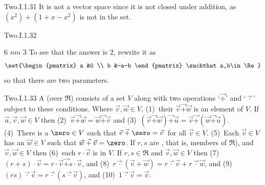 \begin{ans}{Two.I.1.31}
      It is not a vector space since it is not closed under addition, as
      \( (x^2)+(1+x-x^2) \) is not in the set.
    
\end{ans}
\begin{ans}{Two.I.1.32}
      \begin{exparts}
        \partsitem \( 6 \)
        \partsitem \( nm \)
        \partsitem \( 3 \)
        \partsitem To see that the answer is \( 2 \), rewrite it as
        \begin{equation*}
          \set{\begin{pmatrix}
            a  &0  \\
            b  &-a-b
          \end{pmatrix} \suchthat a,b\in\Re}
        \end{equation*}
        so that there are two parameters.
      \end{exparts}
     
\end{ans}
\begin{ans}{Two.I.1.33}
      {
      \def\plus{\mathbin{\vec{+}}}
      \def\tim{\mathbin{\vec{\cdot}}}
        A 
        (over \( \Re \)) consists of a set \( V \) along with
        two operations `\( \plus \)' and `\( \tim \)' subject to these
        conditions.
        Where \( \vec{v},\vec{w}\in V \),
        (1)~their 
          \( \vec{v}\plus\vec{w} \) is an element of \( V \).
        If \( \vec{u},\vec{v},\vec{w}\in V \) then
        (2)~\( \vec{v}\plus\vec{w}=\vec{w}\plus\vec{v} \) and
        (3)~\( (\vec{v}\plus\vec{w})\plus\vec{u}
                 =\vec{v}\plus(\vec{w}\plus\vec{u}) \).
        (4)~There is a 
          \( \zero\in V \) such that
          \( \vec{v}\plus\zero=\vec{v}\, \) for all \( \vec{v}\in V\).
        (5)~Each \( \vec{v}\in V \) has an
          \( \vec{w}\in V \) such that \( \vec{w}\plus\vec{v}=\zero \).
        If \( r,s \) are ,
        that is, members of \( \Re \)),
        and \( \vec{v},\vec{w}\in V \) then
        (6)~each
           \( r\cdot\vec{v} \) is in \( V \).
        If \( r,s\in\Re \) and \( \vec{v},\vec{w}\in V \) then
        (7)~\( (r+ s)\cdot\vec{v}=r\cdot\vec{v}\plus s\cdot\vec{v} \),
        and (8)~\( r\tim (\vec{v}+\vec{w})
           =r\tim\vec{v}+r\tim\vec{w} \),
        and (9)~\( (rs)\tim \vec{v} =r\tim (s\tim\vec{v}) \),
        and (10)~\( 1\tim \vec{v}=\vec{v} \).
     }
    
\end{ans}
